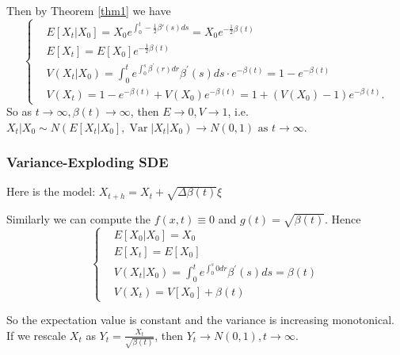 Then by Theorem \ref{thm1} we have
\begin{equation}
    \left\{\begin{aligned}
    &E\left[X_{t} | X_{0}\right]=X_{0} e^{\int_{0}^{t}-\frac{1}{2} \beta'(s) d s}=X_{0} e^{-\frac{1}{2} \beta(t)} \\
    &E\left[X_{t}\right]=E\left[X_{0}\right] e^{-\frac{1}{2} \beta(t)} \\
    &V\left(X_{t} | X_{0}\right)=\int_{0}^{t} e^{\int_{0}^{s} \beta^{\prime}(r) d r} \beta^{\prime}(s) d s \cdot e^{-\beta(t)}=1-e^{-\beta(t)} \\
    &V\left(X_{t}\right)=1-e^{-\beta(t)}+V\left(X_{0}\right) e^{-\beta(t)}=1+\left(V\left(X_{0}\right)-1\right) e^{-\beta(t)} .
    \end{aligned}\right.
\end{equation}
So as  $t \rightarrow \infty,\beta(t) \rightarrow \infty$, then  $E \rightarrow 0, V \rightarrow 1$, i.e. 
$X_{t} | X_{0} \sim N\left(E\left[X_{t} | X_{0}\right], \operatorname{Var}\left|X_{t}\right| X_{0}\right)\rightarrow N(0,1) \text{ as } t \rightarrow \infty$.
 
\subsubsection*{Variance-Exploding SDE}
Here is the model: 
$X_{t+h}=X_{t}+\sqrt{\Delta \beta(t)} \xi$

Similarly we can compute the $f(x, t)\equiv 0$ and $g(t)=\sqrt{\beta(t)}$.
Hence  
\begin{equation}\left\{
    \begin{aligned}
        &E\left[X_{0} | X_{0}\right]=X_{0}\\
        &E\left[X_{t}\right]=E\left[X_{0}\right] \\ 
        &V\left(X_{t} | X_{0}\right)=\int_{0}^{t} e^{\int_{0}^{s} 0 d r} \beta^{\prime}(s) d s=\beta(t)\\ 
        &V\left(X_{t}\right)=V\left[X_{0}\right]+\beta(t)
    \end{aligned}\right.
\end{equation}

So the expectation value is constant and the variance is increasing monotonical. \\
If we rescale  $X_{t}$ as $Y_{t}=\frac{X_{t}}{\sqrt{\beta(t)}}$, then $Y_t \rightarrow N(0,1), t \rightarrow \infty$.

